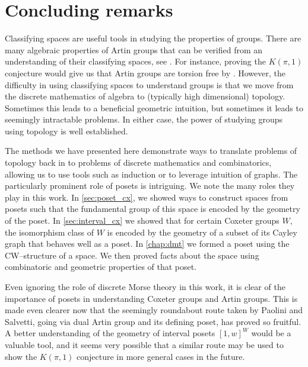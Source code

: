 \documentclass[class=article, crop=false]{standalone}
\begin{document}
\section{Concluding remarks}

Classifying spaces are useful tools in studying the properties of groups. There are many algebraic properties of Artin groups that can be verified from an understanding of their classifying spaces, see \cite{charney_problems_2008}. For instance, proving the $K(\pi,1)$ conjecture would give us that Artin groups are torsion free by \cite[Proposition 2.45]{hatcher_algebraic_2001}. However, the difficulty in using classifying spaces to understand groups is that we move from the discrete mathematics of algebra to (typically high dimensional) topology. Sometimes this leads to a beneficial geometric intuition, but sometimes it leads to seemingly intractable problems. In either case, the power of studying groups using topology is well established.

The methods we have presented here demonstrate ways to translate problems of topology back in to problems of discrete mathematics and combinatorics, allowing us to use tools such as induction or to leverage intuition of graphs. 
The particularly prominent role of posets is intriguing. We note the many roles they play in this work. In \cref{sec:poset_cx}, we showed ways to construct spaces from posets such that the fundamental group of this space is encoded by the geometry of the poset. In \cref{sec:interval_cx} we showed that for certain Coxeter groups $W$, the isomorphism class of $W$ is encoded by the geometry of a subset of its Cayley graph that behaves well as a poset. In \cref{chap:dmt} we formed a poset using the CW--structure of a space. We then proved facts about the space using combinatoric and geometric properties of that poset.

Even ignoring the role of discrete Morse theory in this work, it is clear of the importance of posets in understanding Coxeter groups and Artin groups. This is made even clearer now that the seemingly roundabout route taken by Paolini and Salvetti, going via dual Artin group and its defining poset, has proved so fruitful. A better understanding of the geometry of interval posets $[1,w]^W$ would be a valuable tool, and it seems very possible that a similar route may be used to show the $K(\pi,1)$ conjecture in more general cases in the future.
\end{document}
